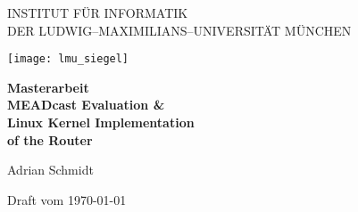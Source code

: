 
\thispagestyle{empty}

\begin{center}

\vspace*{-2cm}

{\Huge INSTITUT FÜR INFORMATIK\\[1mm]}
DER LUDWIG--MAXIMILIANS--UNIVERSITÄT MÜNCHEN\\

\vspace*{1cm}

\texttt{[image: lmu\_siegel]}

\vspace*{2cm}

{\Large \textbf{Masterarbeit}}\\ %

\vspace{2.0cm}
    {\Huge \textbf{MEADcast Evaluation \& }}\\
\vspace*{3mm}
{\Huge \textbf{Linux Kernel Implementation}}\\
\vspace*{3mm}
{\Huge \textbf{of the Router}}\\
\vspace{1.5cm}

{\LARGE Adrian Schmidt} %

\vspace{3cm}
Draft vom \today %

\end{center}

\newpage


\thispagestyle{empty}
\cleardoublepage


\thispagestyle{empty}

